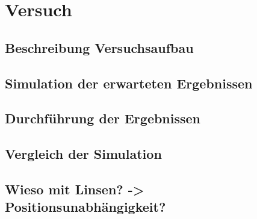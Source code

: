 %
%
%
%
\section{Versuch
\label{opt:section:versuch}}

\subsection{Beschreibung Versuchsaufbau}

\subsection{Simulation der erwarteten Ergebnissen}

\subsection{Durchführung der Ergebnissen}

\subsection{Vergleich der Simulation}

\subsection{Wieso mit Linsen? -> Positionsunabhängigkeit?}
